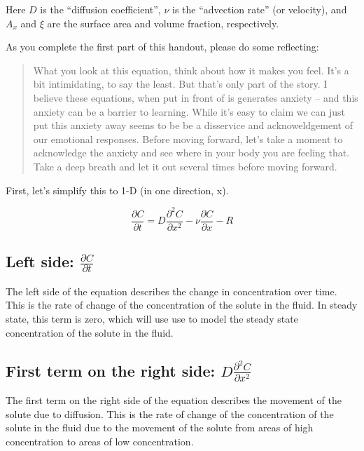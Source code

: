 \documentclass{tufte-handout}\usepackage[]{graphicx}\usepackage[]{xcolor}
\begin{document}
Here $D$ is the ``diffusion coefficient'', $\nu$ is the ``advection rate'' (or velocity), and $A_x$ and $\xi$ are the surface area and volume fraction, respectively.

As you complete the first part of this handout, please do some reflecting: 

\begin{quote}

What you look at this equation, think about how it makes you feel. It's a bit intimidating, to say the least. But that's only part of the story. I believe these equations, when put in front of is generates anxiety -- and this anxiety can be a barrier to learning. While it's easy to claim we can just put this anxiety away seems to be be a disservice and acknoweldgement of our emotional responses. Before moving forward, let's take a moment to acknowledge the anxiety and see where in your body you are feeling that. Take a deep breath and let it out several times before moving forward.

\end{quote} 

First, let's simplify this to 1-D (in one direction, x).

\begin{equation}
\frac{\partial C}{\partial t} = D \frac{\partial^2 C}{\partial x^2} - \nu \frac{\partial C}{\partial x} - R
\end{equation}

\subsection{Left side: $\frac{\partial C}{\partial t}$}

The left side of the equation describes the change in concentration over time. This is the rate of change of the concentration of the solute in the fluid. In steady state, this term is zero, which will use use to model the steady state concentration of the solute in the fluid.

\subsection{First term on the right side: $D \frac{\partial^2 C}{\partial x^2}$}

The first term on the right side of the equation describes the movement of the solute due to diffusion. This is the rate of change of the concentration of the solute in the fluid due to the movement of the solute from areas of high concentration to areas of low concentration.
\end{document}
